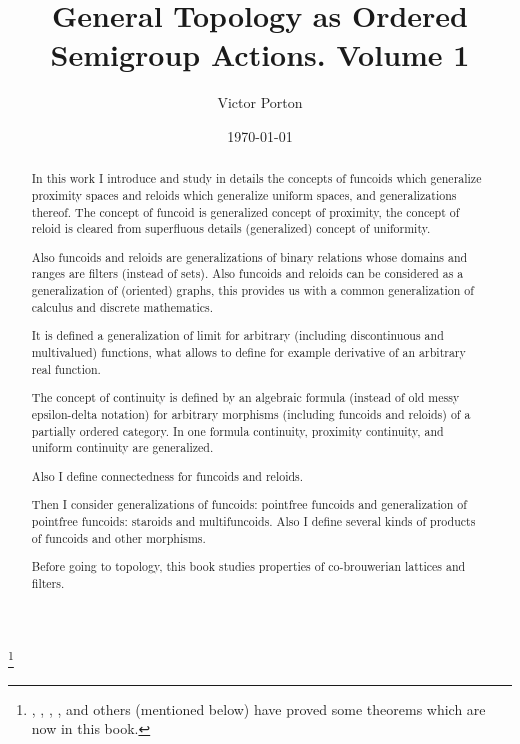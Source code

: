 \documentclass[a4paper,oneside,english,reqno]{amsbook}
\numberwithin{section}{chapter}
\begin{document}
\title{General Topology as Ordered Semigroup Actions. Volume 1}


\author{Victor Porton}






\date{\today}


\thanks{, , , , and others (mentioned below) have proved some theorems which are now in this book.}
\begin{abstract}
In this work I introduce and study in details the concepts of funcoids
which generalize proximity spaces and reloids which generalize uniform
spaces, and generalizations thereof. The concept of funcoid is generalized
concept of proximity, the concept of reloid is cleared from superfluous
details (generalized) concept of uniformity. 

Also funcoids and reloids are generalizations of binary relations
whose domains and ranges are filters (instead of sets). Also funcoids
and reloids can be considered as a generalization of (oriented) graphs,
this provides us with a common generalization of calculus and discrete
mathematics.

It is defined a generalization of limit for arbitrary (including discontinuous and multivalued) functions, what allows to define for example derivative of an arbitrary real function.

The concept of continuity is defined by an algebraic formula (instead
of old messy epsilon-delta notation) for arbitrary morphisms (including
funcoids and reloids) of a partially ordered category. In one formula
continuity, proximity continuity, and uniform continuity are generalized.

Also I define connectedness for funcoids and reloids.

Then I consider generalizations of funcoids: pointfree funcoids and
generalization of pointfree funcoids: staroids and multifuncoids.
Also I define several kinds of products of funcoids and other morphisms.

Before going to topology, this book studies properties of co-brouwerian
lattices and filters.
\end{abstract}


\end{document}
